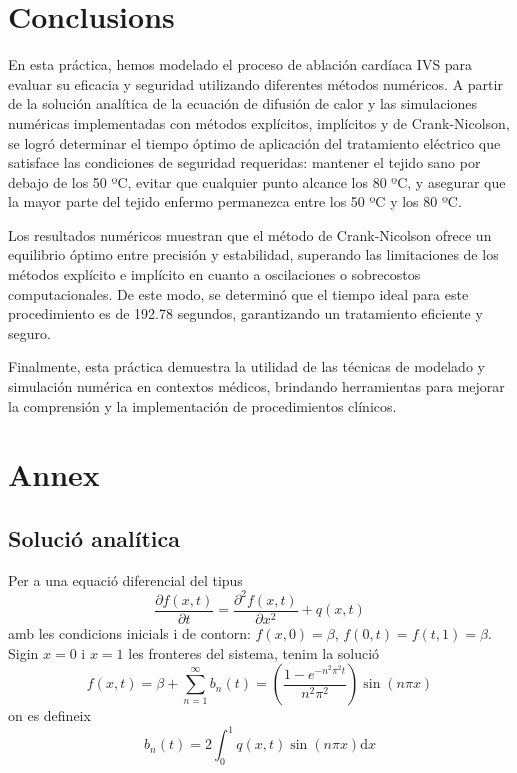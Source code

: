 \documentclass{article}
\begin{document}
\section{Conclusions}
En esta práctica, hemos modelado el proceso de ablación cardíaca IVS para evaluar su eficacia y %
seguridad utilizando diferentes métodos numéricos. A partir de la solución analítica de la ecuación de difusión de calor y las simulaciones numéricas implementadas con métodos explícitos, implícitos y de Crank-Nicolson, se logró determinar el tiempo óptimo de aplicación del tratamiento eléctrico que satisface las condiciones de seguridad requeridas: mantener el tejido sano por debajo de los 50 ºC, evitar que cualquier punto alcance los 80 ºC, y asegurar que la mayor parte del tejido enfermo permanezca entre los 50 ºC y los 80 ºC.

Los resultados numéricos muestran que el método de Crank-Nicolson ofrece un equilibrio óptimo entre precisión y estabilidad, superando las limitaciones de los métodos explícito e implícito en cuanto a oscilaciones o sobrecostos computacionales. De este modo, se determinó que el tiempo ideal para este procedimiento es de 192.78 segundos, garantizando un tratamiento eficiente y seguro.

Finalmente, esta práctica demuestra la utilidad de las técnicas de modelado y simulación numérica en contextos médicos, brindando herramientas para mejorar la comprensión y la implementación de procedimientos clínicos.

\section{Annex}\label{Annex I}
\subsection{Solució analítica}
Per a una equació diferencial del tipus
\begin{equation*}
    \frac{\partial f(x,t)}{\partial t} = \frac{\partial^2 f(x,t)}{\partial x^2} + q(x,t)
\end{equation*}
amb les condicions inicials i de contorn: $f(x,0) = \beta$, $f(0,t)=f(t,1)= \beta$. Sigin $x=0$ i $x=1$ les fronteres del sistema, tenim la solució
\begin{equation*}
    f(x,t) = \beta +\sum_{n=1}^{\infty} b_n(t) = \left( \frac{1-e^{-n^2\pi^2t}}{n^2\pi^2}\right)\sin{(n\pi x)}
\end{equation*}
on es defineix
\begin{equation*}
    b_n(t) = 2\int_{0}^{1} q(x,t)\sin{(n\pi x)}\text{d}x
\end{equation*}
 

\end{document}
